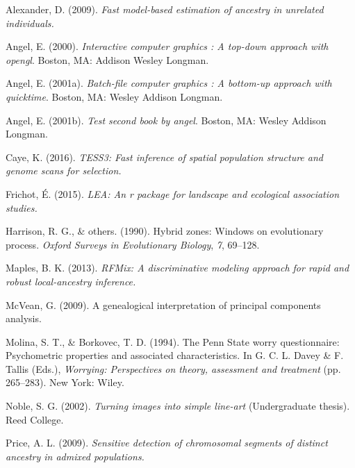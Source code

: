 \documentclass[12pt,twoside]{reedthesis}
\theoremstyle{definition}
\theoremstyle{definition}
\theoremstyle{remark}
\begin{document}
  \noindent
  
  \setlength{\parindent}{-0.20in} \setlength{\leftskip}{0.20in}
  \setlength{\parskip}{8pt}
  
  \hypertarget{refs}{}
  \hypertarget{ref-alexander2009}{}
  Alexander, D. (2009). \emph{Fast model-based estimation of ancestry in
  unrelated individuals.}
  
  \hypertarget{ref-angel2000}{}
  Angel, E. (2000). \emph{Interactive computer graphics : A top-down
  approach with opengl}. Boston, MA: Addison Wesley Longman.
  
  \hypertarget{ref-angel2001}{}
  Angel, E. (2001a). \emph{Batch-file computer graphics : A bottom-up
  approach with quicktime}. Boston, MA: Wesley Addison Longman.
  
  \hypertarget{ref-angel2002a}{}
  Angel, E. (2001b). \emph{Test second book by angel}. Boston, MA: Wesley
  Addison Longman.
  
  \hypertarget{ref-caye2016}{}
  Caye, K. (2016). \emph{TESS3: Fast inference of spatial population
  structure and genome scans for selection.}
  
  \hypertarget{ref-frichot2015}{}
  Frichot, É. (2015). \emph{LEA: An r package for landscape and ecological
  association studies.}
  
  \hypertarget{ref-harrison1990hybrid}{}
  Harrison, R. G., \& others. (1990). Hybrid zones: Windows on
  evolutionary process. \emph{Oxford Surveys in Evolutionary Biology},
  \emph{7}, 69--128.
  
  \hypertarget{ref-maples2013}{}
  Maples, B. K. (2013). \emph{RFMix: A discriminative modeling approach
  for rapid and robust local-ancestry inference.}
  
  \hypertarget{ref-mcvean2009}{}
  McVean, G. (2009). A genealogical interpretation of principal components
  analysis.
  
  \hypertarget{ref-Molina1994}{}
  Molina, S. T., \& Borkovec, T. D. (1994). The Penn State worry
  questionnaire: Psychometric properties and associated characteristics.
  In G. C. L. Davey \& F. Tallis (Eds.), \emph{Worrying: Perspectives on
  theory, assessment and treatment} (pp. 265--283). New York: Wiley.
  
  \hypertarget{ref-noble2002}{}
  Noble, S. G. (2002). \emph{Turning images into simple line-art}
  (Undergraduate thesis). Reed College.
  
  \hypertarget{ref-price2009}{}
  Price, A. L. (2009). \emph{Sensitive detection of chromosomal segments
  of distinct ancestry in admixed populations.}
  
\end{document}
